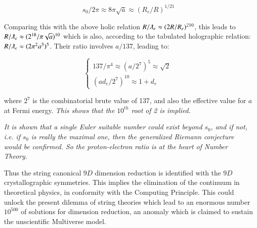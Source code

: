 \documentclass[a4paper,9pt]{article}
\newcounter{row}
\begin{document}
\begin{equation}\label{Eq19}
s_0/2\pi \approx 8\pi \sqrt a \approx (R_e/R)^{1/21}
 \end{equation}

Comparing this with the above holic relation $R/ \lambdabar_e \approx (2R/R_e)^{210}$, this leads to $R/\lambdabar_e \approx (2^{18}/\pi \sqrt a)^{10}$ which is also, according to the tabulated holographic relation: $R/\lambdabar_e \approx (2 \pi^2 a^3)^{5}$. Their ratio involves $a/137$, leading to: 

\begin{equation}\label{Eq21}
 \left\{
    \begin{array}{ll}
        137 / \pi^4 \approx (a/2^7)^5  \approx \sqrt 2 \\
       (ad_e/2^7)^{10} \approx 1 + d_e
    \end{array}
\right.
\end{equation}

where $2^7$ is the combinatorial brute value of 137, and also the effective value for $a$ at Fermi energy. \textit{This shows that the $10^{th}$ root of 2 is implied.}

\textit{It is shown \cite{Weinberger} that a single Euler suitable number could exist beyond $s_0$, and if not, i.e. if $s_0$ is really the maximal one, then the generalized Riemann conjecture would be confirmed. So the proton-electron ratio is at the heart of Number Theory.}

Thus the string canonical $9D$ dimension reduction is identified with the $9D$ crystallographic symmetries. This implies the elimination of the continuum in theoretical physics, in conformity with the Computing Principle. This could unlock the present dilemma of string theories which lead to an enormous number $10^{500}$ of solutions for dimension reduction, an anomaly which is claimed to sustain the unscientific Multiverse model.



 
 
\end{document}
